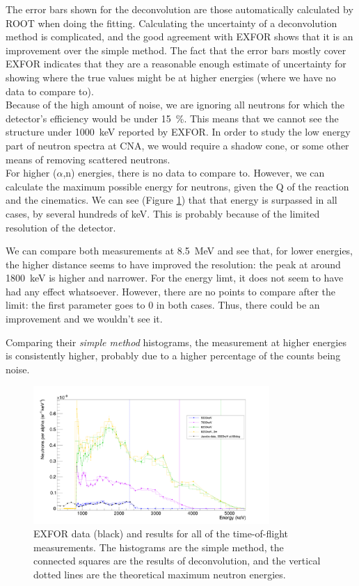 \documentclass[a4paper,12pt]{report}
\newcommand{\an}{($\alpha$,n) }
\begin{document}
The error bars shown for the deconvolution are those automatically calculated by ROOT when doing the fitting.
Calculating the uncertainty of a deconvolution method is complicated, and the good agreement with EXFOR shows that it is an improvement over the simple method.
The fact that the error bars mostly cover EXFOR indicates that they are a reasonable enough estimate of uncertainty for showing where the true values might be at higher energies (where we have no data to compare to).
\\

Because of the high amount of noise, we are ignoring all neutrons for which the detector's efficiency would be under \qty{15}{\percent}.
This means that we cannot see the structure under \qty{1000}{\keV} reported by EXFOR.
In order to study the low energy part of neutron spectra at CNA, we would require a shadow cone, or some other means of removing scattered neutrons.
\\

For higher \an energies, there is no data to compare to.
However, we can calculate the maximum possible energy for neutrons, given the Q of the reaction and the cinematics.
We can see (Figure \ref{pulsed_results}) that that energy is surpassed in all cases, by several hundreds of \unit{\keV}.
This is probably because of the limited resolution of the detector.

We can compare both measurements at \qty{8.5}{\MeV} and see that, for lower energies, the higher distance seems to have improved the resolution: the peak at around \qty{1800}{\keV} is higher and narrower.
For the energy limt, it does not seem to have had any effect whatsoever.
However, there are no points to compare after the limit: the first parameter goes to 0 in both cases.
Thus, there could be an improvement and we wouldn't see it.

Comparing their \textit{simple method} histograms, the measurement at higher energies is consistently higher, probably due to a higher percentage of the counts being noise.
\\

\begin{figure}[H]
	\centering
	\includegraphics[width=0.80\textwidth]{pulsed_results.png}
	\caption{EXFOR data (black) and results for all of the time-of-flight measurements.
	The histograms are the simple method, the connected squares are the results of deconvolution, and the vertical dotted lines are the theoretical maximum neutron energies.}
	\label{pulsed_results}
\end{figure}
\end{document}
